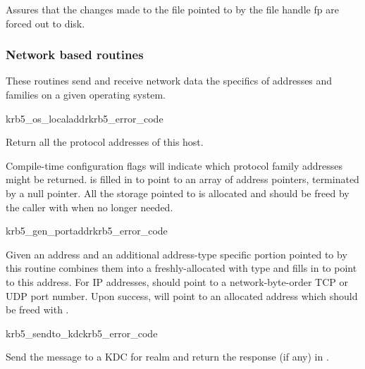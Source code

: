 Assures that the changes made to the file pointed to by the file
handle
fp are forced out to disk.

\subsubsection{Network based routines}

These routines send and receive network data the specifics 
of addresses and families on a given operating system.

\begin{funcdecl}{krb5_os_localaddr}{krb5_error_code}{\funcin}
\funcout
{}
\end{funcdecl}

Return all the protocol addresses of this host.

Compile-time configuration flags will indicate which protocol family
addresses might be returned.
 is filled in to point to an array of address pointers,
terminated by a null pointer.  All the storage pointed to is allocated
and should be freed by the caller with 
when no longer needed.

\begin{funcdecl}{krb5_gen_portaddr}{krb5_error_code}{\funcin}
\funcout
{}
\end{funcdecl}

Given an address  and an additional address-type specific
portion pointed to by
 this routine
combines them into a freshly-allocated
 with type  and fills in
 to point to this address.  For IP addresses,
 should point to a network-byte-order TCP or UDP port
number.  Upon success,  will point to an allocated
address which should be freed with .


\begin{funcdecl}{krb5_sendto_kdc}{krb5_error_code}{\funcin}
\funcout
{}
\end{funcdecl}

Send the message  to a KDC for realm  and
return the response (if any) in .

